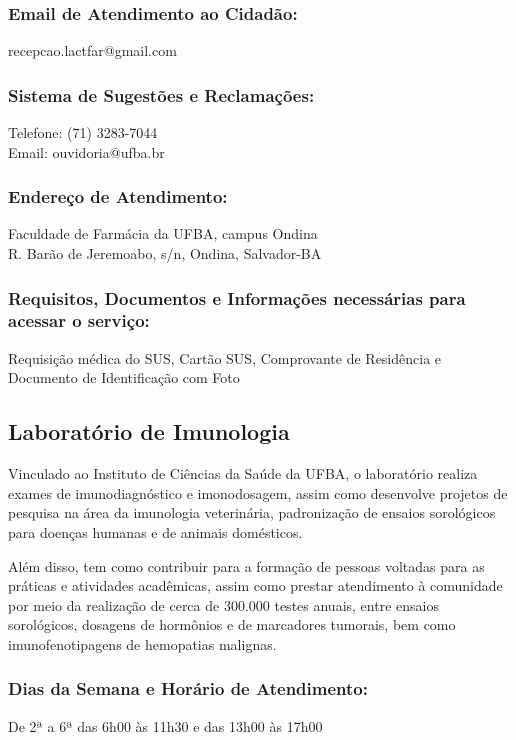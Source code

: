     \subsubsection {Email de Atendimento ao Cidadão:}
        recepcao.lactfar@gmail.com
   
    \subsubsection{Sistema de Sugestões e Reclamações:}
        Telefone: (71) 3283-7044 \\
        Email: ouvidoria@ufba.br

    \subsubsection{Endereço de Atendimento:}
        Faculdade de Farmácia da UFBA, campus Ondina \\
        R. Barão de Jeremoabo, s/n, Ondina, Salvador-BA
        
    \subsubsection{Requisitos, Documentos e Informações necessárias para acessar o serviço:}   
        Requisição médica do SUS, Cartão SUS, Comprovante de Residência e Documento de Identificação com Foto
    

    \subsection{Laboratório de Imunologia}
    
     
        Vinculado ao Instituto de Ciências da Saúde da UFBA, o laboratório
    realiza exames de imunodiagnóstico e imonodosagem, assim como desenvolve projetos de pesquisa na área da imunologia veterinária, padronização de ensaios sorológicos para doenças humanas e de animais domésticos. 
    
        Além disso, tem como contribuir para a formação de pessoas
    voltadas para as práticas e atividades acadêmicas, assim como prestar atendimento à comunidade por meio da realização de cerca de 300.000 testes anuais, entre ensaios sorológicos, dosagens de hormônios e de marcadores tumorais, bem como imunofenotipagens de hemopatias malignas. 

    \subsubsection {Dias da Semana e Horário de Atendimento:}
        De 2ª a 6ª das 6h00 às 11h30 e das 13h00 às 17h00
 
